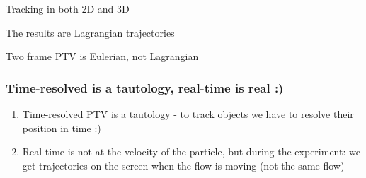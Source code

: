 \begin{frame}[label=ptv-61c]{Tracking in both 2D and 3D}
	\centering{}
\end{frame}

			

\begin{frame}[label=ptv-7]{The results are Lagrangian trajectories}
\centering
{}
\end{frame}

\begin{frame}[label=ptv-71]{Two frame PTV is Eulerian, not Lagrangian}
\centering{}
\end{frame}

\begin{frame}[label=ptv-8]
\frametitle{Time-resolved is a tautology, real-time is real :) }
\begin{enumerate}
\item Time-resolved PTV is a tautology - to track objects we have to resolve their position in time :) 
\item Real-time is not at the velocity of the particle, but during the experiment: we get trajectories on the screen when the flow is moving (not the same flow)
\end{enumerate}
\end{frame}


